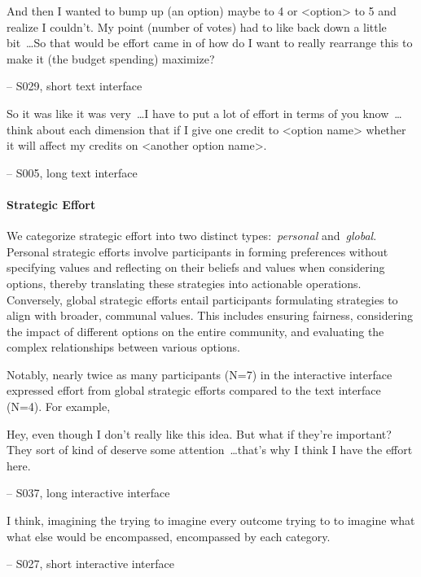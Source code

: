 \begin{displayquote}
And then I wanted to bump up (an option) maybe to 4 or <option> to 5 and realize I couldn't. My point (number of votes) had to like back down a little bit~\ldots So that would be effort came in of how do I want to really rearrange this to make it (the budget spending) maximize?

\noindent \hfill -- S029, short text interface
\end{displayquote}

\begin{displayquote}
So it was like it was very~\ldots I have to put a lot of effort in terms of you know~\ldots think about each dimension that if I give one credit to <option name> whether it will affect my credits on <another option name>.

\noindent \hfill -- S005, long text interface
\end{displayquote}

\paragraph{Strategic Effort}
We categorize strategic effort into two distinct types:~\textit{personal} and~\textit{global}. Personal strategic efforts involve participants in forming preferences without specifying values and reflecting on their beliefs and values when considering options, thereby translating these strategies into actionable operations. Conversely, global strategic efforts entail participants formulating strategies to align with broader, communal values. This includes ensuring fairness, considering the impact of different options on the entire community, and evaluating the complex relationships between various options.

Notably, nearly twice as many participants (N=7) in the interactive interface expressed effort from global strategic efforts compared to the text interface (N=4). For example,

\begin{displayquote}
Hey, even though I don't really like this idea. But what if they're important? They sort of kind of deserve some attention~\ldots that's why I think I have the effort here.

\noindent \hfill -- S037, long interactive interface
\end{displayquote}

\begin{displayquote}
I think, imagining the trying to imagine every outcome trying to to imagine what what else would be encompassed, encompassed by each category.

\noindent \hfill -- S027, short interactive interface
\end{displayquote}

